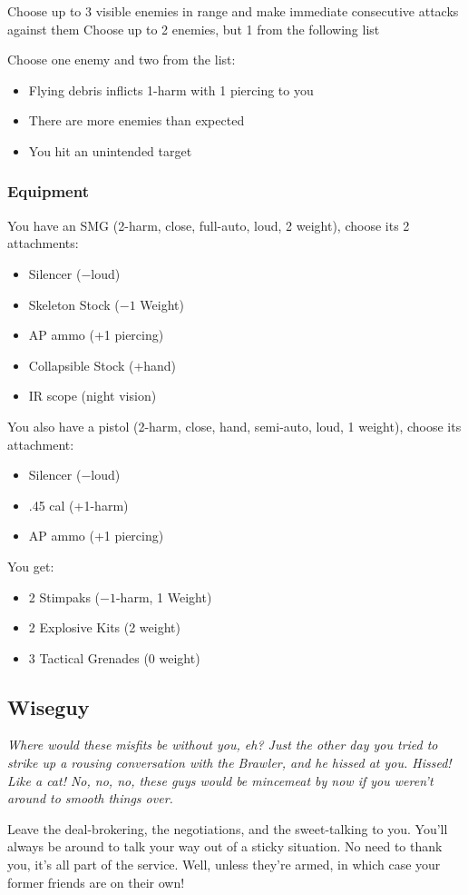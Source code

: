 {Choose up to 3 visible enemies in range and make immediate consecutive attacks against them}
{Choose up to 2 enemies, but 1 from the following list}
{Choose one enemy and two from the list:
\begin{itemize}
\item Flying debris inflicts 1-harm with 1 piercing to you
\item There are more enemies than expected
\item You hit an unintended target
\end{itemize}}

\subsubsection{Equipment}
You have an SMG (2-harm, close, full-auto, loud, 2 weight), choose its 2 attachments:
\begin{itemize}
\item Silencer ($-$loud)
\item Skeleton Stock ($-1$ Weight)
\item AP ammo (+1 piercing)
\item Collapsible Stock (+hand)
\item IR scope (night vision)
\end{itemize}

You also have a pistol (2-harm, close, hand, semi-auto, loud, 1 weight), choose its attachment:
\begin{itemize}
\item Silencer ($-$loud)
\item .45 cal (+1-harm)
\item AP ammo (+1 piercing)
\end{itemize}

You get:
\begin{itemize}
\item 2 Stimpaks ($-1$-harm, 1 Weight)
\item 2 Explosive Kits (2 weight)
\item 3 Tactical Grenades (0 weight)
\end{itemize}



\subsection{Wiseguy}
{\itshape Where would these misfits be without you, eh? Just the other day you tried to strike up a rousing conversation with the Brawler, and he \emph{hissed} at you. Hissed! Like a cat! No, no, no, these guys would be mincemeat by now if you weren't around to smooth things over.

Leave the deal-brokering, the negotiations, and the sweet-talking to you. You'll always be around to talk your way out of a sticky situation. No need to thank you, it's all part of the service. Well, unless they're armed, in which case your former friends are on their own!}
